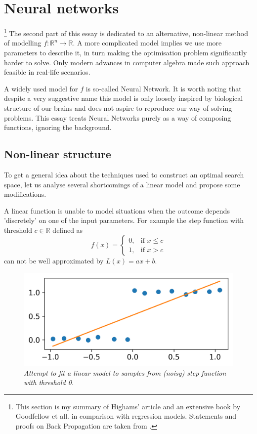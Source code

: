 \documentclass[a4paper,11pt]{article}
\theoremstyle{break}
\newcommand{\R}{\mathbb{R}}
\begin{document}
\section{Neural networks}

\footnote{This section is my summary of Highams' article \cite{higham} and an extensive book by Goodfellow et all. \cite{goodfellow} in comparison with regression models. Statements and proofs on Back Propagation are taken from \cite{higham}.}
%
The second part of this essay is dedicated to an alternative, non-linear method of modelling $ f : \R^n \to \R$. A more complicated model implies we use more parameters to describe it, in turn making the optimisation problem significantly harder to solve. Only modern advances in computer algebra made such approach feasible in real-life scenarios.

A widely used model for $f$ is so-called Neural Network. It is worth noting that despite a very suggestive name this model is only loosely inspired by biological structure of our brains and does not aspire to reproduce our way of solving problems. This essay treats Neural Networks purely as a way of composing functions, ignoring the  background.

\subsection{Non-linear structure}
To get a general idea about the techniques used to construct an optimal search space, let us analyse several shortcomings of a linear model and propose some modifications.

A linear function is unable to model situations when the outcome depends 'discretely' on one of the input parameters.
For example the step function with threshold $c \in \R$ defined as
$$ f(x) =
\begin{cases}
    0,& \text{if } x\leq c\\
    1,& \text{if } x > c
\end{cases}$$
can not be well approximated by $L(x) = a x  + b$.

\begin{figure}[tph]
    \centering
    \includegraphics[width=0.4\linewidth]{step_linfit.png}
    \caption{\textit{Attempt to fit a linear model to samples from (noisy) step function with threshold 0.}}
\end{figure}
\end{document}
